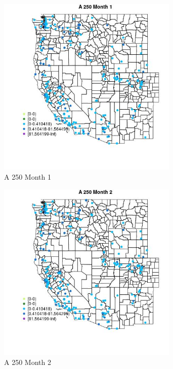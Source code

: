 \begin{figure} 
\centering  
\includegraphics[width=0.77\textwidth]{Code_Outputs/Report_ML_input_PM25_Step4_part_e_de_duplicated_aveswNAs_MapObsMo1A_250.jpg} 
\caption{\label{fig:Report_ML_input_PM25_Step4_part_e_de_duplicated_aveswNAsMapObsMo1A_250}A 250 Month 1} 
\end{figure} 
 

\clearpage 

\begin{figure} 
\centering  
\includegraphics[width=0.77\textwidth]{Code_Outputs/Report_ML_input_PM25_Step4_part_e_de_duplicated_aveswNAs_MapObsMo2A_250.jpg} 
\caption{\label{fig:Report_ML_input_PM25_Step4_part_e_de_duplicated_aveswNAsMapObsMo2A_250}A 250 Month 2} 
\end{figure} 
 

